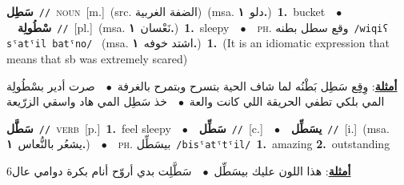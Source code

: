 \documentclass[10pt,a4paper,twoside]{article} %
\begin{document}
\begin{multicols}{2}
{\setlength\topsep{0pt}\textbf{\foreignlanguage{arabic}{سَطِل}}\ {\color{gray}\texttt{//}\color{black}}\ \textsc{noun}\ [m.]\ (src. \color{gray}\foreignlanguage{arabic}{الضفة الغربية}\color{black})\ \color{gray}(msa. \foreignlanguage{arabic}{دلو}~\foreignlanguage{arabic}{\textbf{١.}})\color{black}\ \textbf{1.}~bucket\ \ $\bullet$\ \ \setlength\topsep{0pt}\textbf{\foreignlanguage{arabic}{سْطُولِة}}\ {\color{gray}\texttt{//}\color{black}}\ [pl.]\ \color{gray}(msa. \foreignlanguage{arabic}{نَعْسان}~\foreignlanguage{arabic}{\textbf{١.}})\color{black}\ \textbf{1.}~sleepy\ \ $\bullet$\ \ \textsc{ph.} \color{gray} \foreignlanguage{arabic}{وقع سطل بطنه}\color{black}\ {\color{gray}\texttt{/{\sffamily wiqiʕ sˤatˤil batˤno}/}\color{black}}\ \color{gray} (msa. \foreignlanguage{arabic}{اشتد خوفه}~\foreignlanguage{arabic}{\textbf{١.}})\color{black}\ \textbf{1.}~(It is an idiomatic expression that means that sb was extremely scared)\  \begin{flushright}\color{gray}\foreignlanguage{arabic}{\textbf{\underline{\foreignlanguage{arabic}{أمثلة}}}: وِقِِع سَطِل بَطْنُه لما شاف الحية بتسرح وبتمرح بالغرفة\ $\bullet$\ \  صرت أدير بسْطُولِة المي بلكي تطفي الحريقة اللي كانت والعة\ $\bullet$\ \  خذ سَطِل المي هاد واسقي الزرّيعة}\end{flushright}\color{black}} \vspace{2mm}

{\setlength\topsep{0pt}\textbf{\foreignlanguage{arabic}{سَطَّل}}\ {\color{gray}\texttt{//}\color{black}}\ \textsc{verb}\ [p.]\ \textbf{1.}~feel sleepy\ \ $\bullet$\ \ \setlength\topsep{0pt}\textbf{\foreignlanguage{arabic}{سَطِّل}}\ {\color{gray}\texttt{//}\color{black}}\ [c.]\ \ $\bullet$\ \ \setlength\topsep{0pt}\textbf{\foreignlanguage{arabic}{يسَطِّل}}\ {\color{gray}\texttt{//}\color{black}}\ [i.]\ \color{gray}(msa. \foreignlanguage{arabic}{يشعُر بالنُّعاس}~\foreignlanguage{arabic}{\textbf{١.}})\color{black}\ \ $\bullet$\ \ \textsc{ph.} \color{gray} \foreignlanguage{arabic}{بيسَطِّل}\color{black}\ {\color{gray}\texttt{/{\sffamily bisˤatˤtˤil}/}\color{black}}\ \textbf{1.}~amazing  \textbf{2.}~outstanding\  \begin{flushright}\color{gray}\foreignlanguage{arabic}{\textbf{\underline{\foreignlanguage{arabic}{أمثلة}}}: هذا اللون عليك بيسَطِّل\ $\bullet$\ \  سَطَّلِت بدي أروّح أنام بكرة دوامي عال6}\end{flushright}\color{black}} \vspace{2mm}


\end{multicols}
\end{document}
